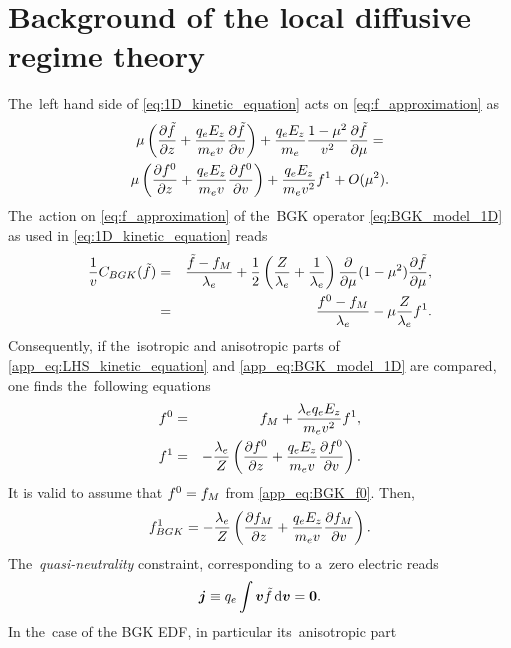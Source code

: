 \section{Background of the local diffusive regime theory}
\label{app:DiffusiveKinetics}

The~left hand side of \eqref{eq:1D_kinetic_equation} acts on 
\eqref{eq:f_approximation} as
\begin{multline}
  \mu\left(\frac{\partial{\tilde{f}}}{\partial{z}} 
  + \frac{q_eE_z}{m_ev}\frac{\partial{\tilde{f}}}{\partial{v}}\right) 
  + \frac{q_eE_z}{m_e}\frac{1-\mu^2}{v^2}\frac{\partial{\tilde{f}}}{\partial{\mu}} = \\
  \mu\left(\frac{\partial{f^0}}{\partial{z}} + \frac{q_eE_z}{m_ev}\frac{\partial{f^0}}{\partial{v}}\right) 
  + \frac{q_eE_z}{m_ev^2} f^1 + O(\mu^2) .
  \label{app_eq:LHS_kinetic_equation}
\end{multline}
The~action on \eqref{eq:f_approximation} of the~BGK operator 
\eqref{eq:BGK_model_1D} as used in \eqref{eq:1D_kinetic_equation} reads
\begin{eqnarray}
  \frac{1}{v}C_{BGK}(\tilde{f})
  &=&
  \frac{\tilde{f} - f_M}{\lambda_e}
  + \frac{1}{2}\left(\frac{Z}{\lambda_e} + \frac{1}{\lambda_e}\right)
  \frac{\partial{}}{\partial{\mu}}(1 - \mu^2)\frac{\partial{\tilde{f}}}{\partial{\mu}} ,\nonumber\\
  &=&  \frac{f^0 - f_M}{\lambda_e}
  - \mu \frac{Z}{\lambda_e}f^1 .
  \label{app_eq:BGK_model_1D}
\end{eqnarray}
Consequently, if the~isotropic and anisotropic parts of 
\eqref{app_eq:LHS_kinetic_equation} and \eqref{app_eq:BGK_model_1D} are 
compared, one finds the~following equations 
\begin{eqnarray}
  f^0 &=& f_M + \frac{\lambda_eq_eE_z}{m_ev^2}f^1 ,
  \label{app_eq:BGK_f0} \\
  f^1 &=& - \frac{\lambda_e}{Z}
  \left( \frac{\partial{f^0}}{\partial{z}} + \frac{q_eE_z}{m_ev}\frac{\partial{f^0}}{\partial{v}} \right) . 
  \label{app_eq:BGK_f1}
\end{eqnarray}
It is valid to assume that $f^0 = f_M$ from \eqref{app_eq:BGK_f0}. Then,
\begin{equation}
  f^1_{BGK} = - \frac{\lambda_e}{Z}
  \left( \frac{\partial{f_M}}{\partial{z}} + \frac{q_eE_z}{m_ev}\frac{\partial{f_M}}{\partial{v}} \right) . 
  \label{app_eq:BGK_f1_fM}
\end{equation}
The~\textit{quasi-neutrality} constraint, corresponding to a~zero 
electric reads
\begin{equation}
\boldsymbol{j} \equiv q_e \int \boldsymbol{v} \tilde{f} \, \text{d}\boldsymbol{v} = \boldsymbol{0} .
\end{equation}
In the~case of the BGK EDF, in particular its~anisotropic part 
